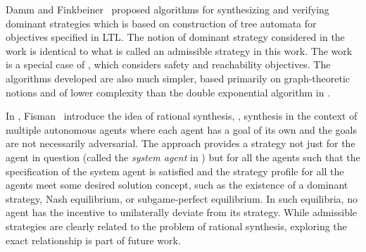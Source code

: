 Damm and
Finkbeiner~\cite{PerimeterOfWorldModel,CompositionalSynthesis}
proposed algorithms for synthesizing and verifying dominant strategies
which is based on construction of tree automata for objectives
specified in LTL.  The notion of dominant strategy considered in the
work is identical to what is called an admissible strategy in this
work. The work is a special case of
\cite{PerimeterOfWorldModel,CompositionalSynthesis}, which considers
safety and reachability objectives. The algorithms developed are also much
simpler, based primarily on graph-theoretic notions and of lower
complexity than the double exponential algorithm in
\cite{PerimeterOfWorldModel,CompositionalSynthesis}.


In \cite{RationalSynthesis}, Fisman \etal\ introduce the idea of
rational synthesis, \ie, synthesis in the context of multiple
autonomous agents where each agent has a goal of its own and the goals
are not necessarily adversarial. The approach provides a strategy not
just for the agent in question (called the \emph{system agent} in
\cite{RationalSynthesis}) but for all the agents such that the
specification of the system agent is satisfied and the strategy
profile for all the agents meet some desired solution concept, such as
the existence of a dominant strategy, Nash equilibrium, or
subgame-perfect equilibrium. In such equilibria, no agent has the
incentive to unilaterally deviate from its strategy. While admissible
strategies are clearly related to the problem of rational synthesis,
exploring the exact relationship is part of future work.
